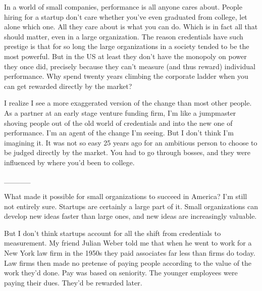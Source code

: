 In a world of small
                  companies, performance is all anyone cares about. People
                  hiring for a startup don't care whether you've even graduated
                  from college, let alone which one. All they care about is what
                  you can do. Which is in fact all that should matter, even in a
                  large organization. The reason credentials have such prestige
                  is that for so long the large organizations in a society
                  tended to be the most powerful. But in the US at least they
                  don't have the monopoly on power they once did, precisely
                  because they can't measure (and thus reward) individual
                  performance. Why spend twenty years climbing the corporate
                  ladder when you can get rewarded directly by the market?

I
                  realize I see a more exaggerated version of the change than
                  most other people. As a partner at an early stage venture
                  funding firm, I'm like a jumpmaster shoving people out of the
                  old world of credentials and into the new one of performance.
                  I'm an agent of the change I'm seeing. But I don't think I'm
                  imagining it. It was not so easy 25 years ago for an ambitious
                  person to choose to be judged directly by the market. You had
                  to go through bosses, and they were influenced by where you'd
                  been to college.


                  \_\_\_\_\_
                  

What made it possible for small organizations to
                  succeed in America? I'm still not entirely sure. Startups are
                  certainly a large part of it. Small organizations can develop
                  new ideas faster than large ones, and new ideas are
                  increasingly valuable.

But I don't think startups
                  account for all the shift from credentials to measurement. My
                  friend Julian Weber told me that when he went to work for a
                  New York law firm in the 1950s they paid associates far less
                  than firms do today. Law firms then made no pretense of paying
                  people according to the value of the work they'd done. Pay was
                  based on seniority. The younger employees were paying their
                  dues. They'd be rewarded later.

